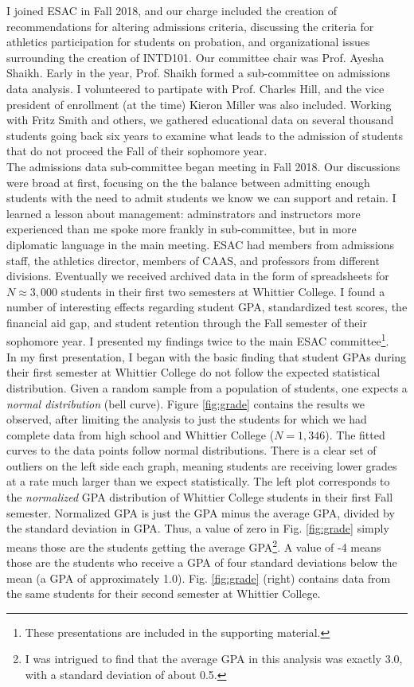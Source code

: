 \documentclass[../../../main.tex]{subfiles}
\begin{document}
I joined ESAC in Fall 2018, and our charge included the creation of recommendations for altering admissions criteria, discussing the criteria for athletics participation for students on probation, and organizational issues surrounding the creation of INTD101.  Our committee chair was Prof. Ayesha Shaikh.  Early in the year, Prof. Shaikh formed a sub-committee on admissions data analysis.  I volunteered to partipate with Prof. Charles Hill, and the vice president of enrollment (at the time) Kieron Miller was also included.  Working with Fritz Smith and others, we gathered educational data on several thousand students going back six years to examine what leads to the admission of students that do not proceed the Fall of their sophomore year.
\\
\vspace{0.25cm}
The admissions data sub-committee began meeting in Fall 2018.  Our discussions were broad at first, focusing on the the balance between admitting enough students with the need to admit students we know we can support and retain.  I learned a lesson about management: adminstrators and instructors more experienced than me spoke more frankly in sub-committee, but in more diplomatic language in the main meeting.  ESAC had members from admissions staff, the athletics director, members of CAAS, and professors from different divisions.  Eventually we received archived data in the form of spreadsheets for $N \approx 3,000$ students in their first two semesters at Whittier College.  I found a number of interesting effects regarding student GPA, standardized test scores, the financial aid gap, and student retention through the Fall semester of their sophomore year.  I presented my findings twice to the main ESAC committee\footnote{These presentations are included in the supporting material.}.
\\
\vspace{0.25cm}
In my first presentation, I began with the basic finding that student GPAs during their first semester at Whittier College do not follow the expected statistical distribution.  Given a random sample from a population of students, one expects a \textit{normal distribution} (bell curve).  Figure \ref{fig:grade} contains the results we observed, after limiting the analysis to just the students for which we had complete data from high school and Whittier College ($N = 1,346$).  The fitted curves to the data points follow normal distributions.  There is a clear set of outliers on the left side each graph, meaning students are receiving lower grades at a rate much larger than we expect statistically.  The left plot corresponds to the \textit{normalized} GPA distribution of Whittier College students in their first Fall semester.  Normalized GPA is just the GPA minus the average GPA, divided by the standard deviation in GPA.  Thus, a value of zero in Fig. \ref{fig:grade} simply means those are the students getting the average GPA\footnote{I was intrigued to find that the average GPA in this analysis was exactly 3.0, with a standard deviation of about 0.5.}.  A value of -4 means those are the students who receive a GPA of four standard deviations below the mean (a GPA of approximately 1.0).  Fig. \ref{fig:grade} (right) contains data from the same students for their second semester at Whittier College.
\end{document}
